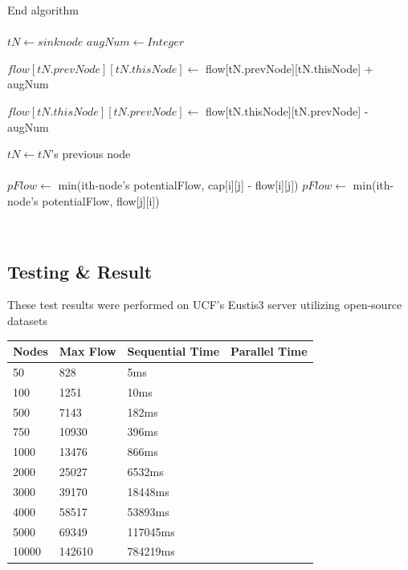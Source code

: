 \begin{algorithmic}
                End algorithm\\\\
                
                \State $tN \gets sink node$ 
                \State $augNum \gets Integer$ 
            
                        \State $flow[tN.prevNode][tN.thisNode] \gets$ flow[tN.prevNode][tN.thisNode] + augNum
                    
                    \Else \State $flow[tN.thisNode][tN.prevNode] \gets$ flow[tN.thisNode][tN.prevNode] - augNum
                        
                    \EndIf
                    
                    \State $tN \gets tN$'s previous node
                \EndWhile
            \EndFunction\\\\
    
                	\State 
                	    $pFlow \gets$ min(ith-node's potentialFlow, cap[i][j] - flow[i][j])
                \Else
                    \State
    			        $pFlow \gets$ min(ith-node's potentialFlow, flow[j][i])
                \EndIf
            \EndFunction
            \end{algorithmic}\\

\subsection{Testing \& Result}
    These test results were performed on UCF's Eustis3 server utilizing open-source datasets \cite{sumitpadhiyar}
    \begin{tabular}{ | m{4em} | m{5em }| m{5em} | m{5em} | } 
      \hline
      Nodes & Max Flow & Sequential Time & Parallel Time \\ 
      
        \hline
        50      & 828     & 5ms &\\
        \hline
        100     & 1251    & 10ms & \\  
        \hline
        500     & 7143    & 182ms & \\        
        \hline   
        750     & 10930   & 396ms & \\         
        \hline
        1000    & 13476   & 866ms & \\       
        \hline
        2000    & 25027   & 6532ms & \\
        \hline
        3000    & 39170   & 18448ms & \\       
        \hline
        4000    & 58517   & 53893ms & \\
        \hline
        5000    & 69349   & 117045ms & \\
        \hline
        10000   & 142610  & 784219ms & \\
        \hline
    \end{tabular}